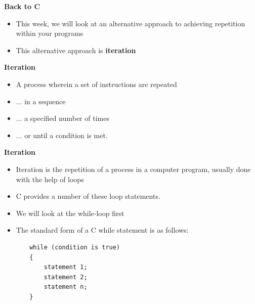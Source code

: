 \documentclass{beamer}
\begin{document}
\begin{frame} 
\begin{center}
\textbf{Back to C}
\end{center}
\begin{itemize}
\item This week, we will look at an alternative approach to achieving repetition within your programs 
\item This alternative approach is\textbf{ iteration}
\end{itemize}
\end{frame}

\begin{frame} 
\begin{center}
\textbf{Iteration}
\end{center}
\begin{itemize}
\item A process wherein a set of instructions are repeated 
\item ... in a sequence 
\item ... a specified number of times 
\item ... or until a condition is met.
\end{itemize}
\end{frame}

\begin{frame} 
\begin{center}
\textbf{Iteration}
\end{center}
\begin{itemize}
\item Iteration is the repetition of a process in a computer program, usually done with the help of loops
\bigskip
\item C provides a number of these loop statements. 
\item We will look at the while-loop first
\end{itemize}
\end{frame}

\begin{frame}[fragile] 
\begin{itemize}
\item The standard form of a C while statement is as follows:
\end{itemize}

\begin{block}{}
\begin{lstlisting}
       while (condition is true) 
       {
           statement 1;
           statement 2;
           statement n;
       }

\end{lstlisting}
\end{block}
\end{frame} 
\end{document}
